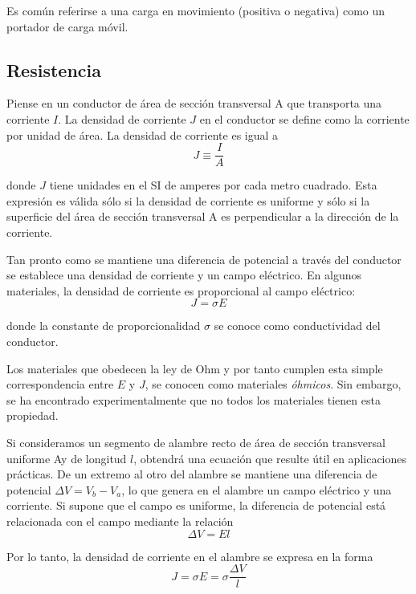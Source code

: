    \PN Es común referirse a una carga en movimiento (positiva o negativa) como un portador de carga móvil.

  \subsection{Resistencia}
    \PN Piense en un conductor de área de sección transversal A que transporta una corriente $I$. La densidad de
    corriente $J$ en el conductor se define como la corriente por unidad de área. La densidad de corriente es igual a
    \begin{equation*}
      J \equiv \frac{I}{A}
    \end{equation*}

    \PN donde $J$ tiene unidades en el SI de amperes por cada metro cuadrado. Esta expresión es válida sólo si la
    densidad de corriente es uniforme y sólo si la superficie del área de sección transversal A es perpendicular a la
    dirección de la corriente.

    \PN Tan pronto como se mantiene una diferencia de potencial a través del conductor se establece una densidad de
    corriente y un campo eléctrico. En algunos materiales, la densidad de corriente es proporcional al campo eléctrico:
    \begin{equation*}
      J = \sigma E
    \end{equation*}

    \PN donde la constante de proporcionalidad $\sigma$ se conoce como conductividad del conductor.

    \PN Los materiales que obedecen la ley de Ohm y por tanto cumplen esta simple correspondencia entre $E$ y $J$, se
    conocen como materiales \textit{óhmicos}. Sin embargo, se ha encontrado experimentalmente que no todos los
    materiales tienen esta propiedad.

    \PN Si consideramos un segmento de alambre recto de área de sección transversal uniforme Ay de longitud $l$,
    obtendrá una ecuación que resulte útil en aplicaciones prácticas. De un extremo al otro del alambre se mantiene una
    diferencia de potencial $\Delta V = V_{b} - V_{a}$, lo que genera en el alambre un campo eléctrico y una corriente.
    Si supone que el campo es uniforme, la diferencia de potencial está relacionada con el campo mediante la relación
    \begin{equation*}
      \Delta V = E l
    \end{equation*}

    \PN Por lo tanto, la densidad de corriente en el alambre se expresa en la forma
    \begin{equation*}
      J = \sigma E = \sigma \frac{\Delta V}{l}
    \end{equation*}

